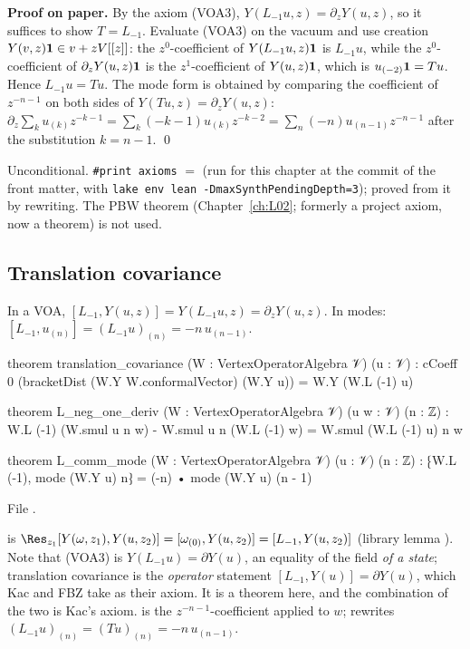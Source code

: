 \textbf{Proof on paper.} By the axiom (VOA3), $Y(L_{-1}u,z) = \partial_zY(u,z)$, so it suffices to show
$T = L_{-1}$. Evaluate (VOA3) on the vacuum and use creation $Y(v,z)\mathbf{1}\in v+zV[[z]]$: the $z^0$-coefficient of
$Y(L_{-1}u,z)\mathbf{1}$ is $L_{-1}u$, while the $z^0$-coefficient of $\partial_zY(u,z)\mathbf{1}$ is the
$z^1$-coefficient of $Y(u,z)\mathbf{1}$, which is $u_{(-2)}\mathbf{1} = Tu$. Hence $L_{-1}u = Tu$. The mode form
is obtained by comparing the coefficient of $z^{-n-1}$ on both sides of $Y(Tu,z) = \partial_zY(u,z)$:
$\partial_z\sum_ku_{(k)}z^{-k-1} = \sum_k(-k-1)u_{(k)}z^{-k-2} = \sum_n(-n)u_{(n-1)}z^{-n-1}$ after the substitution $k=n-1$. \qed

\begin{status}
Unconditional. \texttt{\#print axioms}  $=$
\lean{[propext, Classical.}\allowbreak{}\allowbreak\lean{sound]} (run for this chapter at the
commit of the front matter, with \texttt{lake env lean -DmaxSynthPendingDepth=3});  proved from it by
rewriting. The PBW theorem  (Chapter~\ref{ch:L02}; formerly a project axiom, now a theorem) is not used.
\end{status}

\subsection{Translation covariance}

\begin{theorem}\label{l03:thm:transcov}
In a VOA, $[L_{-1},Y(u,z)] = Y(L_{-1}u,z) = \partial_zY(u,z)$. In modes:
$[L_{-1},u_{(n)}] = (L_{-1}u)_{(n)} = -n\,u_{(n-1)}$.
\end{theorem}
\begin{leancode}
theorem translation_covariance (W : VertexOperatorAlgebra 𝒱) (u : 𝒱) :
    cCoeff 0 (bracketDist (W.Y W.conformalVector) (W.Y u)) = W.Y (W.L (-1) u)

theorem L_neg_one_deriv (W : VertexOperatorAlgebra 𝒱) (u w : 𝒱) (n : ℤ) :
    W.L (-1) (W.smul u n w) - W.smul u n (W.L (-1) w) = W.smul (W.L (-1) u) n w

theorem L_comm_mode (W : VertexOperatorAlgebra 𝒱) (u : 𝒱) (n : ℤ) :
    ⁅W.L (-1), mode (W.Y u) n⁆ = (-n) • mode (W.Y u) (n - 1)
\end{leancode}
File .

\begin{dictionary}
 is $\Res_{z_1}[Y(\omega,z_1),Y(u,z_2)] = [\omega_{(0)},Y(u,z_2)]
= [L_{-1},Y(u,z_2)]$ (library lemma ). Note that (VOA3) is
$Y(L_{-1}u) = \partial Y(u)$, an equality of the field \emph{of a state}; translation covariance is the
\emph{operator} statement $[L_{-1},Y(u)] = \partial Y(u)$, which Kac and FBZ take as their axiom. It
is a theorem here, and the combination of the two is Kac's axiom.  is the
$z^{-n-1}$-coefficient applied to $w$;  rewrites $(L_{-1}u)_{(n)} = (Tu)_{(n)} =
-n\,u_{(n-1)}$.
\end{dictionary}


